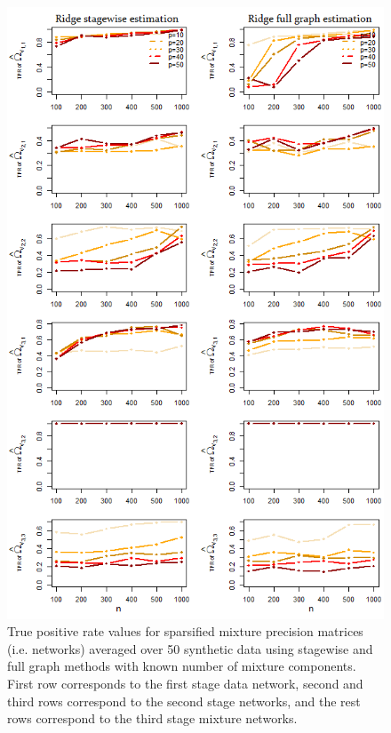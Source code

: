 \documentclass[10pt]{article}
\begin{document}
\begin{figure}
\begin{center}
 \includegraphics[scale=.6]{TPR.png}
\end{center}
\caption{True positive rate values for sparsified mixture precision matrices (i.e. networks) averaged over 50 synthetic data using stagewise and full graph methods with known number of mixture components. First row corresponds to the first stage data network, second and third rows correspond to the second stage networks, and the rest rows correspond to the third stage mixture networks.}
\label{fig:TPR}
\end{figure}
\end{document}

